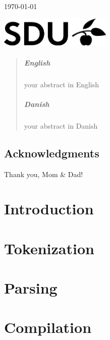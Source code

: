\documentclass[a4paper,12pt]{report}
\begin{document}
\begin{titlepage}
\vfill\vfill

{\large\today} %

\vfill\vfill
\includegraphics[width=0.4\textwidth]{SDU_BLACK_RGB.png}\\[1cm]

\vfill

\end{titlepage}


\begin{abstract}
\paragraph{English}
your abstract in English

\paragraph{Danish}
your abstract in Danish
\end{abstract}

\newpage
\section*{Acknowledgments}
Thank you, Mom \& Dad!

\newpage
\tableofcontents

\newpage

\newpage
{} 
\setcounter{page}{1}

\chapter{Introduction}

\chapter{Tokenization}

\chapter{Parsing}


\chapter{Compilation}

\end{document}
